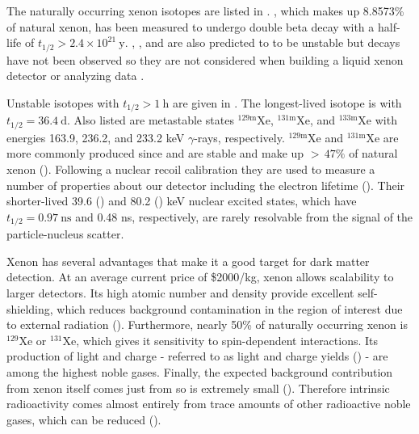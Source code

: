 The naturally occurring xenon isotopes are listed in .  , which makes up 8.8573\% of natural xenon,
has been measured to undergo double beta decay with a half-life of $t_{1/2} > 2.4 \times 10^{21}\ \mathrm{y}$.  ,
,
and  are also predicted to to be unstable but decays have not been observed so they are not considered when building a
liquid xenon detector or analyzing data .

Unstable isotopes with $t_{1/2} > 1\ \mathrm{h}$ are given in .  The longest-lived isotope is
 with $t_{1/2} = 36.4\ \mathrm{d}$.  Also listed are metastable states $\mathrm{^{129m}Xe}$, $\mathrm{^{131m}Xe}$, and
$\mathrm{^{133m}Xe}$ with energies 163.9, 236.2, and 233.2 keV $\gamma$-rays, respectively.  $\mathrm{^{129m}Xe}$ and $\mathrm{^{131m}Xe}$
are more commonly produced since  and  are stable and make up ${>}\, 47\%$ of natural xenon
().  Following a nuclear recoil calibration they are used to measure a number of properties about our detector
including the electron lifetime ().  Their shorter-lived 39.6
() and 80.2 () keV nuclear
excited states, which have $t_{1/2} = 0.97\ \mathrm{ns}$ and 0.48 ns, respectively, are rarely resolvable from the signal of the
particle-nucleus scatter.

Xenon has several advantages that make it a good target for dark matter detection.  At an average current price of \$2000/kg, xenon allows
scalability to larger detectors.  Its high atomic number and density provide excellent self-shielding, which reduces background contamination
in the region of interest due to external radiation
().  Furthermore, nearly 50\% of naturally occurring xenon is $^{129}$Xe or $^{131}$Xe,
which gives it sensitivity to spin-dependent interactions.  Its production of light and charge - referred to as light and charge yields
() - are among the highest noble gases.  Finally, the expected background contribution
from xenon itself comes just from  so is extremely small ().  Therefore
intrinsic radioactivity comes almost entirely from trace amounts of other radioactive noble gases, which can be reduced
().


